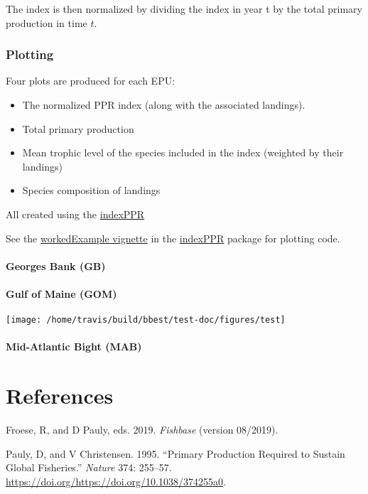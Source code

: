 \documentclass[
]{book}
\providecommand{\tightlist}{%
  \setlength{\itemsep}{0pt}\setlength{\parskip}{0pt}}
\begin{document}
The index is then normalized by dividing the index in year t by the total primary production in time \(t\).

\hypertarget{plotting}{%
\subsection{Plotting}\label{plotting}}

Four plots are produced for each EPU:

\begin{itemize}
\tightlist
\item
  The normalized PPR index (along with the associated landings).
\item
  Total primary production
\item
  Mean trophic level of the species included in the index (weighted by their landings)
\item
  Species composition of landings
\end{itemize}

All created using the \href{https://github.com/andybeet/indexPPR}{indexPPR}

See the \href{https://github.com/andybeet/indexPPR/tree/master/vignettes}{workedExample vignette} in the \href{https://github.com/andybeet/indexPPR/}{indexPPR} package for plotting code.

\hypertarget{georges-bank-gb}{%
\subsubsection{Georges Bank (GB)}\label{georges-bank-gb}}

\hypertarget{gulf-of-maine-gom}{%
\subsubsection{Gulf of Maine (GOM)}\label{gulf-of-maine-gom}}

\texttt{[image: /home/travis/build/bbest/test-doc/figures/test]}

\hypertarget{mid-atlantic-bight-mab}{%
\subsubsection{Mid-Atlantic Bight (MAB)}\label{mid-atlantic-bight-mab}}

\hypertarget{references}{%
\chapter*{References}\label{references}}

\hypertarget{refs}{}
\leavevmode\hypertarget{ref-froese2019fishbase}{}%
Froese, R, and D Pauly, eds. 2019. \emph{Fishbase} (version 08/2019).

\leavevmode\hypertarget{ref-pauly1995ppr}{}%
Pauly, D, and V Christensen. 1995. ``Primary Production Required to Sustain Global Fisheries.'' \emph{Nature} 374: 255--57. \url{https://doi.org/https://doi.org/10.1038/374255a0}.
\end{document}
